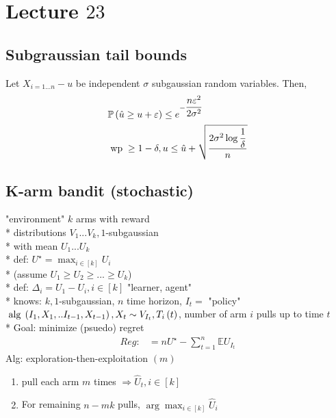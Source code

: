 \documentclass{article}
\begin{document}
\section{Lecture $23$} 

\subsection{Subgraussian tail bounds}
Let $X_{i = 1 ... n} - u $ be independent $\sigma$ subgaussian random variables. Then,
\begin{align*}
&  \mathbb{P}\left(\hat{u} \geq  u + \varepsilon\right) \leq  e^{- \dfrac{n \varepsilon^{2}}{2 \sigma^{2}}}
\\ &  \text{\;wp\;} \geq  1 - \delta, u \leq  \hat{u} + \sqrt{\dfrac{2 \sigma^{2} \log \dfrac{1}{\delta}}{n}}
\end{align*}


\subsection{K-arm bandit (stochastic)}
"environment" $k $ arms with reward
\\* distributions $V_{1} ... V_{k}, 1$-subgaussian
\\* with mean $U_{1} ... U_{k}$
\\* def: $U^\star  = \displaystyle\max_{i \in \left[k\right]} U_{i}$
\\* (assume $U_{1} \geq  U_{2} \geq  ... \geq  U_{k}$)
\\* def: $\Delta_{i} = U_{1} - U_{i}, i \in \left[k\right]$
\newline \newline
"learner, agent"
\\* knows: $k  , 1$-subgaussian, $n $ time horizon, $I_{t} =$ "policy" $\text{\;alg\;} \left(I_{1}, X_{1}, .. I_{t-1}, X_{t-1}\right) , X_{t} \sim  V_{I_{t}}, T_{i}\left(t\right)$, number of arm $i $ pulls up to time $t $
\\* Goal: minimize (psuedo) regret
\begin{align*}
Reg  :&= n U^\star  - \displaystyle\sum_{t=1}^{n} \mathbb{E} U_{I_{t}}
\end{align*}
Alg: exploration-then-exploitation $\left(m \right)$
\begin{enumerate}
\item pull each arm $m $ times $\Rightarrow  \hat{U}_{t} , i \in \left[k\right]$
\item For remaining $n  - m k $ pulls, $\arg\displaystyle\max_{i \in \left[k\right]} \hat{U}_{i}$
\end{enumerate}
\end{document}
